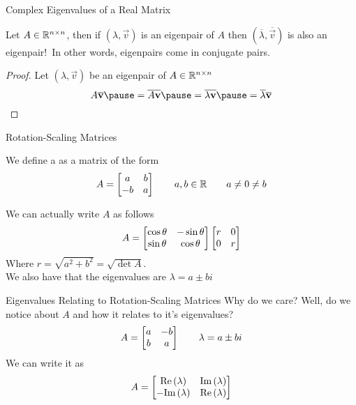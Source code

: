 \documentclass[xcoler=dvipsnames, aspectratio=169]{beamer}
\renewcommand{\Re}[1]{\textrm{Re}\left(#1\right)}
\renewcommand{\Im}[1]{\textrm{Im}\left(#1\right)}
\begin{document}
    \begin{frame}{Complex Eigenvalues of a Real Matrix}
        \begin{theorem}
            Let $A\in\mathbb{R}^{n\times n}$, then if $(\lambda,\vec{v})$ is an eigenpair of $A$ then 
            $(\overline{\lambda}, \overline{\vec{v}})$ is also an eigenpair!\pause\
            In other words, eigenpairs come in conjugate pairs.
        \end{theorem}
        \vfill
        \begin{proof}
            Let $(\lambda,\vec{v})$ be an eigenpair of $A\in\mathbb{R}^{n\times n}$
            \[
                A\overline{\vec{v}}\pause = \overline{A\vec{v}}\pause = 
                \overline{\lambda\vec{v}}\pause = \overline{\lambda}\overline{\vec{v}}
            \]
        \end{proof}
    \end{frame}
    \begin{frame}{Rotation-Scaling Matrices}
        \small
        \begin{defn}
            We define a  as a matrix of the form
            \[
                A = \begin{bmatrix}
                    a & b\\
                    -b & a
                \end{bmatrix}\qquad a,b\in\mathbb{R} \qquad a\neq 0\neq b
            \]
        \end{defn}\pause
        We can actually write $A$ as follows
        \[
            A = \begin{bmatrix}
                \cos\theta & -\sin\theta\\
                \sin\theta & \cos\theta
            \end{bmatrix}\begin{bmatrix}
                r & 0\\
                0 & r
            \end{bmatrix}
        \]\pause
        Where $r = \sqrt{a^2+b^2} = \sqrt{\det{A}}$.
        \pause\\
        We also have that the eigenvalues are $\lambda = a\pm bi$
    \end{frame}
    \begin{frame}{Eigenvalues Relating to Rotation-Scaling Matrices}
        Why do we care? Well, do we notice about $A$ and how it relates to it's eigenvalues?
        \[
            A = \begin{bmatrix}
                a & -b\\
                b & a
            \end{bmatrix} \qquad \lambda=a\pm bi
        \]\pause
        We can write it as 
        \[
            A = \bMat{
                \Re{\lambda} & \Im{\lambda}\\
                -\Im{\lambda}& \Re{\lambda}
            }
        \]
    \end{frame}
\end{document}
